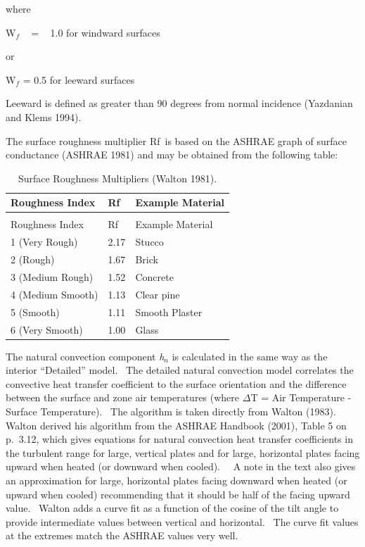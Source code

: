 where

W\(_{f}\) ~ = ~ 1.0 for windward surfaces

or

W\(_{f}\) = 0.5 for leeward surfaces

Leeward is defined as greater than 90 degrees from normal incidence (Yazdanian and Klems 1994).

The surface roughness multiplier Rf~is based on the ASHRAE graph of surface conductance (ASHRAE 1981) and may be obtained from the following table:

\begin{longtable}[c]{@{}lll@{}}
\caption{Surface Roughness Multipliers (Walton 1981). \label{table:surface-roughness-multipliers-walton-1981.}} \tabularnewline
\toprule 
Roughness Index & Rf & Example Material \tabularnewline
\midrule
\endfirsthead

\caption[]{Surface Roughness Multipliers (Walton 1981).} \tabularnewline
\toprule 
Roughness Index & Rf & Example Material \tabularnewline
\midrule
\endhead

1 (Very Rough) & 2.17 & Stucco \tabularnewline
2 (Rough) & 1.67 & Brick \tabularnewline
3 (Medium Rough) & 1.52 & Concrete \tabularnewline
4 (Medium Smooth) & 1.13 & Clear pine \tabularnewline
5 (Smooth) & 1.11 & Smooth Plaster \tabularnewline
6 (Very Smooth) & 1.00 & Glass \tabularnewline
\bottomrule
\end{longtable}

The natural convection component \emph{h\(_{n}\)} is calculated in the same way as the interior ``Detailed'' model.~ The detailed natural convection model correlates the convective heat transfer coefficient to the surface orientation and the difference between the surface and zone air temperatures (where $\Delta$T = Air Temperature - Surface Temperature).~ The algorithm is taken directly from Walton (1983).~ Walton derived his algorithm from the ASHRAE Handbook (2001), Table 5 on p.~3.12, which gives equations for natural convection heat transfer coefficients in the turbulent range for large, vertical plates and for large, horizontal plates facing upward when heated (or downward when cooled).~~ A note in the text also gives an approximation for large, horizontal plates facing downward when heated (or upward when cooled) recommending that it should be half of the facing upward value.~ Walton adds a curve fit as a function of the cosine of the tilt angle to provide intermediate values between vertical and horizontal.~ The curve fit values at the extremes match the ASHRAE values very well.

